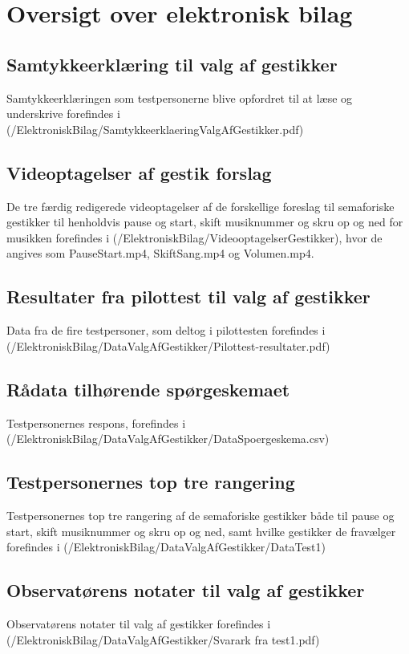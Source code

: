 \chapter{Oversigt over elektronisk bilag}
\label{app:OversigtOverElektroniskBilag}
%
%
\section{Samtykkeerklæring til valg af gestikker}
\label{app:SamtykkeerklaeringValgAfGestikker}
%
Samtykkeerklæringen som testpersonerne blive opfordret til at læse og underskrive forefindes i (/ElektroniskBilag/SamtykkeerklaeringValgAfGestikker.pdf)
%
\section{Videoptagelser af gestik forslag}
\label{app:VideoptagelserGestikker}
%
De tre færdig redigerede videoptagelser af de forskellige foreslag til semaforiske gestikker til henholdvis pause og start, skift musiknummer og skru op og ned for musikken forefindes i (/ElektroniskBilag/VideooptagelserGestikker), hvor de angives som PauseStart.mp4, SkiftSang.mp4 og Volumen.mp4.
%
\section{Resultater fra pilottest til valg af gestikker}
\label{app:ResultaterPilottestValgAfGestikker}
%
Data fra de fire testpersoner, som deltog i pilottesten forefindes i \\
(/ElektroniskBilag/DataValgAfGestikker/Pilottest-resultater.pdf)
%
\section{Rådata tilhørende spørgeskemaet}
\label{app:RaaDataSpoergeskema}
%
Testpersonernes respons, forefindes i (/ElektroniskBilag/DataValgAfGestikker/DataSpoergeskema.csv)
%
\section{Testpersonernes top tre rangering}
\label{app:TestpersonernesTopTre}
%
Testpersonernes top tre rangering af de semaforiske gestikker både til pause og start, skift musiknummer og skru op og ned, samt hvilke gestikker de fravælger forefindes i (/ElektroniskBilag/DataValgAfGestikker/DataTest1)
%
\section{Observatørens notater til valg af gestikker}
\label{app:NoterValgAfGestikker}
%
Observatørens notater til valg af gestikker forefindes i (/ElektroniskBilag/DataValgAfGestikker/Svarark fra test1.pdf)
%
